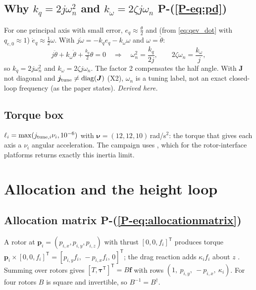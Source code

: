 \documentclass[11pt]{article}
\newcommand{\srcroot}{../../..}
\newcommand{\T}{^{\mathsf T}}
\newcommand{\PE}[1]{P-(\ref{P-#1})}          %
\newcommand{\code}[1]{\texttt{\detokenize{#1}}}
\theoremstyle{remark}
\newcommand{\listing}[4]{%
  }
\begin{document}
\subsection{Why $k_q=2j\omega_n^2$ and $k_\omega=2\zeta j\omega_n$ \PE{eq:pd}}
For one principal axis with small error, $e_q\approx\frac\theta2$ and (from \eqref{eq:qev_dot} with
$q_{e,0}\approx1$) $\dot e_q\approx\frac12\omega$. With $j\dot\omega=-k_qe_q-k_\omega\omega$ and
$\omega=\dot\theta$:
\[
j\ddot\theta+k_\omega\dot\theta+\tfrac{k_q}{2}\theta=0
\quad\Longrightarrow\quad
\omega_n^2=\frac{k_q}{2j},\qquad 2\zeta\omega_n=\frac{k_\omega}{j},
\]
so $k_q=2j\omega_n^2$ and $k_\omega=2\zeta j\omega_n$. The factor 2 compensates the half angle. With
$\bm J$ not diagonal and $\bm j_{\rm tune}\ne\operatorname{diag}(\bm J)$ (X2), $\omega_n$ is a tuning
label, not an exact closed-loop frequency (as the paper states). \emph{Derived here.}
\listing{experiments/nengo_nef_replication_2026-08-29/run_mujoco_nef.py}{159}{165}{inertia, limits, gains}

\subsection{Torque box}
$\ell_i=\max(j_{{\rm tune},i}\nu_i,10^{-6})$ with $\bm\nu=(12,12,10)$\,rad/s$^2$: the torque that gives
each axis a $\nu_i$ angular acceleration. The campaign uses \code{--torque-policy model}, which for the
rotor-interface platforms returns exactly this inertia limit.
\listing{src/gra_control/platforms/drone.py}{76}{98}{\code{torque_limits}}

\section{Allocation and the height loop}
\subsection{Allocation matrix \PE{eq:allocationmatrix}}
A rotor at $\bm p_i=(p_{i,x},p_{i,y},p_{i,z})$ with thrust $[0,0,f_i]\T$ produces torque
$\bm p_i\times[0,0,f_i]\T=[p_{i,y}f_i,\,-p_{i,x}f_i,\,0]\T$; the drag reaction adds $\kappa_if_i$ about $z$
\cite{garciacarrillo2013quad}. Summing over rotors gives
$[T,\bm\tau\T]\T=B\bm f$ with rows $(1,\ p_{i,y},\ -p_{i,x},\ \kappa_i)$. For four rotors $B$ is square and
invertible, so $B^{-1}=B^\dagger$.
\listing{src/gra_control/platforms/drone.py}{67}{73}{$B$ from site positions and gear, \code{np.linalg.inv(B)}}
\end{document}
